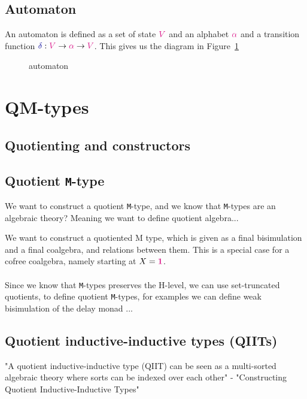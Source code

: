 \documentclass[twoside,11pt,openright]{report}
\theoremstyle{plain} %
\theoremstyle{definition}
\theoremstyle{remark}
\newcommand*{\figref}[1]{Figure~\ref{fig:#1}}
\newcommand*{\type}[1]{\textcolor{magenta!90!black}{#1}}
\newcommand*{\unit}{\type{\textbf{1}}}
\newcommand*{\function}[1]{\textcolor{blue!60!black}{\ensuremath{\mathtt{#1}}}}
\begin{document}
\section{Automaton}
An automaton is defined as a set of state \(\type{V}\) and an alphabet \(\type{\alpha}\) and a transition function \(\function{\delta} : \type{V} \rightarrow \type{\alpha} \rightarrow \type{V}\). This gives us the diagram in \figref{automaton}
\begin{figure}[h]
  \centering
  \caption{automaton}
  \label{fig:automaton}
\end{figure}


\chapter{QM-types}
\section{Quotienting and constructors}
\section{Quotient \texttt{M}-type}
We want to construct a quotient \texttt{M}-type, and we know that \texttt{M}-types are an algebraic theory? Meaning we want to define quotient algebra...

We want to construct a quotiented M type, which is given as a final bisimulation and a final coalgebra, and relations between them. This is a special case for a cofree coalgebra, namely starting at \(X = \unit\).
\\ \\
Since we know that \texttt{M}-types preserves the H-level, we can use set-truncated quotients, to define quotient \texttt{M}-types, for examples we can define weak bisimulation of the delay monad ...

\section{Quotient inductive-inductive types (QIITs)}
"A quotient inductive-inductive type (QIIT) can be seen as a multi-sorted algebraic theory where sorts can be indexed over each other" - "Constructing Quotient Inductive-Inductive Types"
\end{document}
